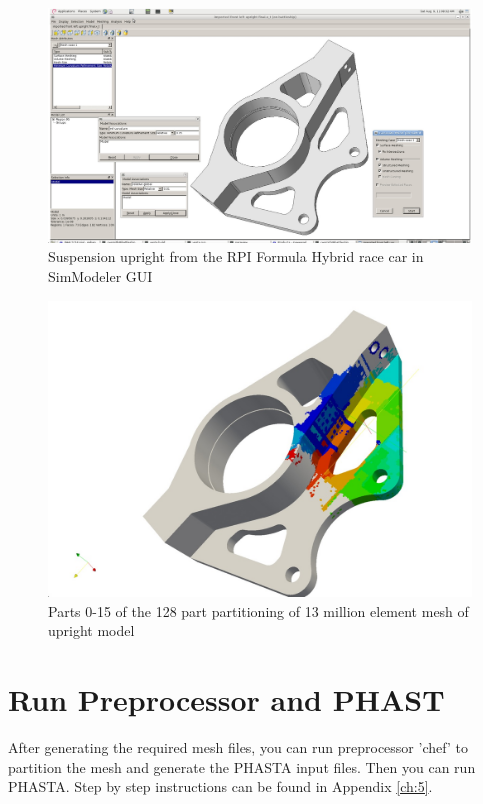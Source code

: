 \documentclass{article}
\begin{document}
\begin{figure}[h!]
\centering
\includegraphics[width=1\textwidth]{albany1}
\caption{Suspension upright from the RPI Formula Hybrid race car in SimModeler GUI}
\label{fig:3} 
\end{figure}
\begin{figure}[h!]
\centering
\includegraphics[width=1\textwidth]{albany2}
\caption{Parts 0-15 of the 128 part partitioning of 13 million element mesh of upright model}
\label{fig:4} 
\end{figure}

\section{Run Preprocessor and PHAST}
After generating the required mesh files, you can run preprocessor 'chef' to partition the mesh and generate the PHASTA input files. Then you can run PHASTA. Step by step instructions can be found in Appendix \ref{ch:5}.
\end{document}
